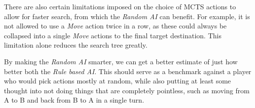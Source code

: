 There are also certain limitations imposed on the choice of MCTS actions to allow for faster search,
from which the \emph{Random AI} can benefit. For example, it is not allowed to use a \emph{Move}
action twice in a row, as these could always be collapsed into a single \emph{Move} actions to the
final target destination. This limitation alone reduces the search tree greatly.

By making the \emph{Random AI} smarter, we can get a better estimate of just how better
both the \emph{Rule based AI}. This should serve as a benchmark against a player who would
pick actions mostly at random, while also putting at least some thought into not doing things
that are completely pointless, such as moving from A to B and back from B to A in a single turn.
